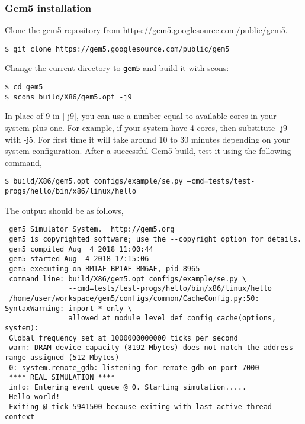 \documentclass[12pt]{article}
\begin{document}
\subsubsection*{Gem5 installation} 
Clone the gem5 repository from \url{https://gem5.googlesource.com/public/gem5}.

\vspace{0.25cm}
\noindent
\texttt{\$ git clone https://gem5.googlesource.com/public/gem5}

\vspace{0.25cm}
\noindent
Change the current directory to \texttt{gem5} and build it with scons:

\vspace{0.25cm}
\noindent
\texttt{\$ cd gem5 \\
 \$ scons build/X86/gem5.opt -j9}

\vspace{0.25cm}
\noindent
In place of 9 in [-j9], you can use a number equal to available cores in your system plus one. 
For example, if your system have 4 cores, then substitute -j9 with -j5. 
For first time it will take around 10 to 30 minutes depending on your system configuration. 
After a successful Gem5 build, test it using the following command,


\vspace{0.25cm}
\noindent
\texttt{\$ \small{build/X86/gem5.opt configs/example/se.py --cmd=tests/test-progs/hello/bin/x86/linux/hello}}

\vspace{0.25cm}
\noindent
The output should be as follows,
\begin{footnotesize}
\begin{verbatim}
 gem5 Simulator System.  http://gem5.org
 gem5 is copyrighted software; use the --copyright option for details.
 gem5 compiled Aug  4 2018 11:00:44
 gem5 started Aug  4 2018 17:15:06
 gem5 executing on BM1AF-BP1AF-BM6AF, pid 8965
 command line: build/X86/gem5.opt configs/example/se.py \
               --cmd=tests/test-progs/hello/bin/x86/linux/hello
 /home/user/workspace/gem5/configs/common/CacheConfig.py:50: SyntaxWarning: import * only \ 
               allowed at module level def config_cache(options, system):
 Global frequency set at 1000000000000 ticks per second
 warn: DRAM device capacity (8192 Mbytes) does not match the address range assigned (512 Mbytes)
 0: system.remote_gdb: listening for remote gdb on port 7000
 **** REAL SIMULATION ****
 info: Entering event queue @ 0. Starting simulation.....
 Hello world!
 Exiting @ tick 5941500 because exiting with last active thread context 
\end{verbatim}
\end{footnotesize}
\end{document}

